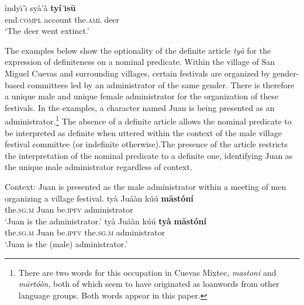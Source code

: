 \documentclass[output=paper,modfonts,nonflat]{langsci/langscibook}
\begin{document}
\ea {}\label{ex:cisneros:1}
\gll
\`indy\=\i'\=\i{} sy\`a'\`a {\ob}{\op}\textbf{ty\'i}{\cp} \textbf{\=\i s\=u}{\cb}\\
end.\textsc{compl} account \phantom{[(}the.\textsc{aml} deer\\
\glt
`The deer went extinct.'
\z

The examples below show the optionality of the definite article \textit{ty\`a} for the expression of definiteness on a nominal predicate.  Within the village of San Miguel Cuevas and surrounding villages, certain festivals are organized by gender-based committees led by an administrator of the same gender.  There is therefore a unique male and unique female administrator for the organization of these festivals.  In the examples, a character named Juan is being presented as an administrator.\footnote{There are two words for this occupation in Cuevas Mixtec, \emph{mastoni} and \emph{m\=art\'o\`on}, both of which seem to have originated as loanwords from other language groups.  Both words appear in this paper.}  The absence of a definite article allows the nominal predicate to be interpreted as definite when uttered within the context of the male village festival committee (or indefinite otherwise).\largerpage  The presence of the article restricts the interpretation of the nominal predicate to a definite one, identifying Juan as the unique male administrator regardless of context.

\ea {}\label{ex:cisneros:2}
Context: Juan is presented as the male administrator within a meeting of men organizing a village festival.
\ea
\gll
{\ob}ty\`a Ju\'a\`an{\cb} k\'u\'u \textbf{m\=ast\'on\'i}\\
\phantom{[}the.\textsc{sg.m} Juan be.\textsc{ipfv} administrator\\
\glt
`Juan is the administrator.'
\ex
\gll
{\ob}ty\`a Ju\'a\`an{\cb} k\'u\'u {\ob}\textbf{ty\`a} \textbf{m\=ast\'on\'i}{\cb}\\
\phantom{[}the.\textsc{sg.m} Juan be.\textsc{ipfv} \phantom{[}the.\textsc{sg.m} administrator\\
\glt
`Juan is the (male) administrator.'
\z 
\z 
\end{document}
